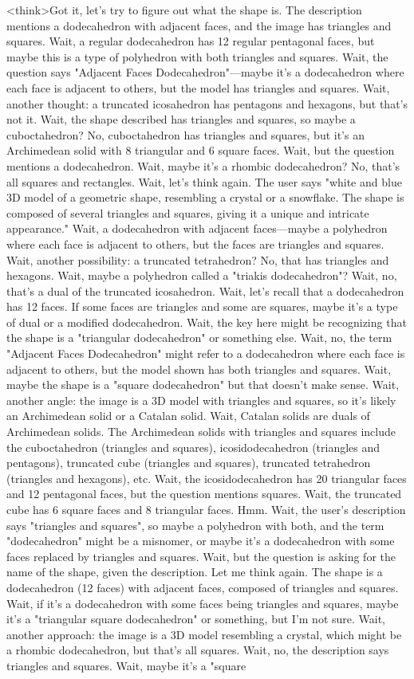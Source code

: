 <think>Got it, let's try to figure out what the shape is. The description mentions a dodecahedron with adjacent faces, and the image has triangles and squares. Wait, a regular dodecahedron has 12 regular pentagonal faces, but maybe this is a type of polyhedron with both triangles and squares. Wait, the question says "Adjacent Faces Dodecahedron"—maybe it's a dodecahedron where each face is adjacent to others, but the model has triangles and squares. Wait, another thought: a truncated icosahedron has pentagons and hexagons, but that's not it. Wait, the shape described has triangles and squares, so maybe a cuboctahedron? No, cuboctahedron has triangles and squares, but it's an Archimedean solid with 8 triangular and 6 square faces. Wait, but the question mentions a dodecahedron. Wait, maybe it's a rhombic dodecahedron? No, that's all squares and rectangles. Wait, let's think again. The user says "white and blue 3D model of a geometric shape, resembling a crystal or a snowflake. The shape is composed of several triangles and squares, giving it a unique and intricate appearance." Wait, a dodecahedron with adjacent faces—maybe a polyhedron where each face is adjacent to others, but the faces are triangles and squares. Wait, another possibility: a truncated tetrahedron? No, that has triangles and hexagons. Wait, maybe a polyhedron called a "triakis dodecahedron"? Wait, no, that's a dual of the truncated icosahedron. Wait, let's recall that a dodecahedron has 12 faces. If some faces are triangles and some are squares, maybe it's a type of dual or a modified dodecahedron. Wait, the key here might be recognizing that the shape is a "triangular dodecahedron" or something else. Wait, no, the term "Adjacent Faces Dodecahedron" might refer to a dodecahedron where each face is adjacent to others, but the model shown has both triangles and squares. Wait, maybe the shape is a "square dodecahedron" but that doesn't make sense. Wait, another angle: the image is a 3D model with triangles and squares, so it's likely an Archimedean solid or a Catalan solid. Wait, Catalan solids are duals of Archimedean solids. The Archimedean solids with triangles and squares include the cuboctahedron (triangles and squares), icosidodecahedron (triangles and pentagons), truncated cube (triangles and squares), truncated tetrahedron (triangles and hexagons), etc. Wait, the icosidodecahedron has 20 triangular faces and 12 pentagonal faces, but the question mentions squares. Wait, the truncated cube has 6 square faces and 8 triangular faces. Hmm. Wait, the user's description says "triangles and squares", so maybe a polyhedron with both, and the term "dodecahedron" might be a misnomer, or maybe it's a dodecahedron with some faces replaced by triangles and squares. Wait, but the question is asking for the name of the shape, given the description. Let me think again. The shape is a dodecahedron (12 faces) with adjacent faces, composed of triangles and squares. Wait, if it's a dodecahedron with some faces being triangles and squares, maybe it's a "triangular square dodecahedron" or something, but I'm not sure. Wait, another approach: the image is a 3D model resembling a crystal, which might be a rhombic dodecahedron, but that's all squares. Wait, no, the description says triangles and squares. Wait, maybe it's a "square 
